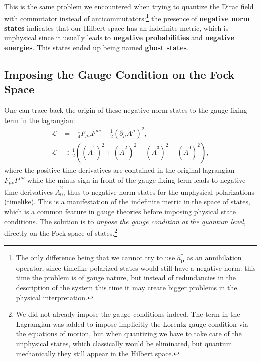 This is the same problem we encountered when trying to quantize the Dirac field with commutator instead of anticommutators:\footnote{The only difference being that we cannot try to use \(\hat{a}^{\dagger}_{\mathbf{p}}\) as an annihilation operator, since timelike polarized states would still have a negative norm: this time the problem is of gauge nature, but instead of redundancies in the description of the system this time it may create bigger problems in the physical interpretation.} the presence of \textbf{negative norm states} indicates that our Hilbert space has an indefinite metric, which is unphysical since it usually leads to \textbf{negative probabilities} and \textbf{negative energies}. This states ended up being named \textbf{ghost states}.

\subsection{Imposing the Gauge Condition on the Fock Space}

One can trace back the origin of these negative norm states to the gauge-fixing term in the lagrangian:
\[
    \begin{aligned}
        \mathcal{L} & = -\frac{1}{4} F_{\mu\nu} F^{\mu\nu} -\frac{1}{2} (\partial_\mu A^{\mu})^2,                       \\
        \mathcal{L} & \supset \frac{1}{2} \left( (\dot{A}^1)^2 + (\dot{A}^2)^2 + (\dot{A}^3)^2 - (\dot{A}^0)^2 \right),
    \end{aligned}
\]
where the positive time derivatives are contained in the original lagrangian \(F_{\mu\nu}F^{\mu \nu}\) while the minus sign in front of the gauge-fixing term leads to negative time derivatives \(\dot{A}_0^2\), thus to negative norm states for the unphysical polarizations (timelike). This is a manifestation of the indefinite metric in the space of states, which is a common feature in gauge theories before imposing physical state conditions.
The solution is to \textit{impose the gauge condition at the quantum level}, directly on the Fock space of states.\footnote{We did not already impose the gauge conditions indeed. The term in the Lagrangian was added to impose implicitly the Lorentz gauge condition via the equations of motion, but when quantizing we have to take care of the unphysical states, which classically would be eliminated, but quantum mechanically they still appear in the Hilbert space.}

